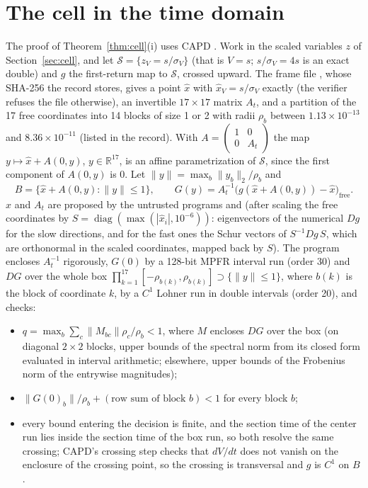 \documentclass[11pt]{article}
\theoremstyle{definition}
\newcommand{\R}{\mathbb{R}}
\begin{document}
\section{The cell in the time domain}\label{sec:capd}

The proof of Theorem~\ref{thm:cell}(i) uses CAPD \cite{capd2021}. Work in the scaled variables $z$ of Section~\ref{sec:cell}, and let $\mathcal S = \{z_V = s/\sigma_V\}$ (that is $V = s$; $s/\sigma_V = 4s$ is an exact double) and $g$ the first-return map to $\mathcal S$, crossed upward. The frame file , whose SHA-256 the record  stores, gives a point $\hat x$ with $\hat x_V = s/\sigma_V$ exactly (the verifier refuses the file otherwise), an invertible $17 \times 17$ matrix $A_t$, and a partition of the 17 free coordinates into 14 blocks of size 1 or 2 with radii $\rho_b$ between $1.13 \times 10^{-13}$ and $8.36 \times 10^{-11}$ (listed in the record). With $A = \begin{pmatrix}1 & 0\\ 0 & A_t\end{pmatrix}$ the map $y \mapsto \hat x + A(0, y)$, $y \in \R^{17}$, is an affine parametrization of $\mathcal S$, since the first component of $A(0, y)$ is $0$. Let $\|y\| = \max_b\|y_b\|_2/\rho_b$ and
\[ B = \{\hat x + A(0, y) : \|y\| \le 1\}, \qquad G(y) = A_t^{-1}\big(g(\hat x + A(0, y)) - \hat x\big)_{\mathrm{free}}. \]
$\hat x$ and $A_t$ are proposed by the untrusted programs  and  (after scaling the free coordinates by $S = \operatorname{diag}(\max(|\hat x_i|, 10^{-6}))$: eigenvectors of the numerical $Dg$ for the slow directions, and for the fast ones the Schur vectors of $S^{-1}Dg\,S$, which are orthonormal in the scaled coordinates, mapped back by $S$). The program  encloses $A_t^{-1}$ rigorously, $G(0)$ by a 128-bit MPFR interval run (order 30) and $DG$ over the whole box $\prod_{k=1}^{17}[-\rho_{b(k)}, \rho_{b(k)}] \supset \{\|y\| \le 1\}$, where $b(k)$ is the block of coordinate $k$, by a $C^1$ Lohner run in double intervals (order 20), and checks:
\begin{itemize}
\item $q = \max_b\sum_c\|M_{bc}\|\rho_c/\rho_b < 1$, where $M$ encloses $DG$ over the box (on diagonal $2 \times 2$ blocks, upper bounds of the spectral norm from its closed form evaluated in interval arithmetic; elsewhere, upper bounds of the Frobenius norm of the entrywise magnitudes);
\item $\|G(0)_b\|/\rho_b + (\text{row sum of block } b) < 1$ for every block $b$;
\item every bound entering the decision is finite, and the section time of the center run lies inside the section time of the box run, so both resolve the same crossing; CAPD's crossing step checks that $dV/dt$ does not vanish on the enclosure of the crossing point, so the crossing is transversal and $g$ is $C^1$ on $B$.
\end{itemize}
\end{document}
